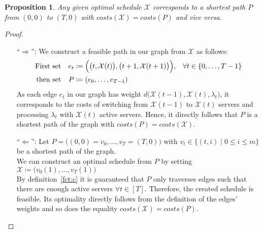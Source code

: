 \documentclass[hidelinks]{article}
\theoremstyle{plain}
\newtheorem{prop}[thm]{Proposition}
\theoremstyle{definition}
\theoremstyle{rem}
\newcommand{\mx}{\mathcal{X}}
\newcommand{\fromto}[2]{\{#1,\ldots,#2\}}
\begin{document}
\begin{prop}
	Any given optimal schedule $\mx$ corresponds to a shortest path $P$ from $(0,0)$ to $(T,0)$ with $costs(\mx)=costs(P)$ and vice versa.
\end{prop} 
\begin{proof}
$ $
\begin{itemize}
	\item[``$\Rightarrow$'':] We construct a feasible path in our graph from $\mx$ as follows:
\begin{align*}
	\text{First set}&&e_t&\coloneqq\Bigl(\bigl(t,\mx(t)\bigr),\bigl(t+1,\mx(t+1)\bigr)\Bigr),&\forall t\in\fromto{0}{T-1}\\
	\text{then set}&&P&\coloneqq(e_0,\ldots,e_{T-1})
\end{align*}
As each edge $e_t$ in our graph has weight $d\bigl(\mx(t-1),\mx(t),\lambda_{t}\bigr)$, it corresponds to the costs of switching from $\mx(t-1)$ to $\mx(t)$ servers and processing $\lambda_{t}$ with $\mx(t)$ active servers. Hence, it directly follows that $P$ is a shortest path of the graph with $costs(P)=costs(\mx)$.
	\item[``$\Leftarrow$'':] Let $P=\bigl((0,0)=v_0,\ldots,v_T=(T,0)\bigr)$ with $v_t\in\bigl\{(t,i)\mid 0\le i\le m\bigr\}$ be a shortest path of the graph.\\ 
	We can construct an optimal schedule from $P$ by setting $\mx\coloneqq\bigl(v_0(1),\ldots,v_T(1)\bigr)$\\
	By definition~\eqref{fct:c} it is guaranteed that $P$ only traverses edges such that there are enough active servers $\forall t\in[T]$. Therefore, the created schedule is feasible. Its optimality directly follows from the definition of the edges' weights and so does the equality $costs(\mx)=costs(P)$.
\end{itemize}
\end{proof}
\end{document}
